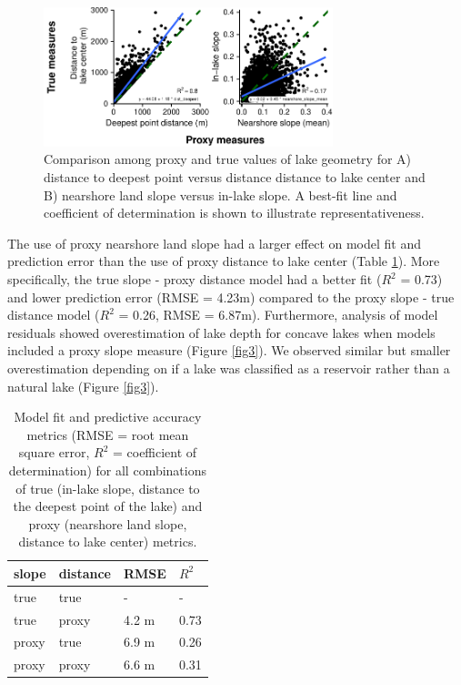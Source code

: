 \documentclass[draft]{agujournal2019}
\begin{document}
\begin{figure}
  \begin{center}
    \includegraphics[width=0.75\textwidth,keepaspectratio]{../figures/01_geometry_base-1}
  \end{center}
  \caption{Comparison among proxy and true values of lake geometry for A) distance to deepest point versus distance distance to lake center and B) nearshore land slope versus in-lake slope. A best-fit line and coefficient of determination is shown to illustrate representativeness.}\label{fig2}
\end{figure}

The use of proxy nearshore land slope had a larger effect on model fit and prediction error than the use of proxy distance to lake center (Table \ref{table2}). More specifically, the true slope - proxy distance model had a better fit ($R^2$ = 0.73) and lower prediction error (RMSE = 4.23m) compared to the proxy slope - true distance model ($R^2$ = 0.26, RMSE = 6.87m). Furthermore, analysis of model residuals showed overestimation of lake depth for concave lakes when models included a proxy slope measure (Figure \ref{fig3}). We observed similar but smaller overestimation depending on if a lake was classified as a reservoir rather than a natural lake (Figure \ref{fig3}).

\begin{table}[h]
  \caption{Model fit and predictive accuracy metrics (RMSE = root mean square error, $R^2$ = coefficient of determination) for all combinations of true (in-lake slope, distance to the deepest point of the lake) and proxy (nearshore land slope, distance to lake center) metrics.} \label{table2}
  \centering
\begin{tabular}{llll}
  \hline
  slope & distance & RMSE & $R^2$\\
  \hline
  true & true & - & -\\
  true & proxy & 4.2 m & 0.73\\
  proxy & true & 6.9 m & 0.26\\
  proxy & proxy & 6.6 m & 0.31\\
  \hline
\end{tabular}
\end{table}
\end{document}
